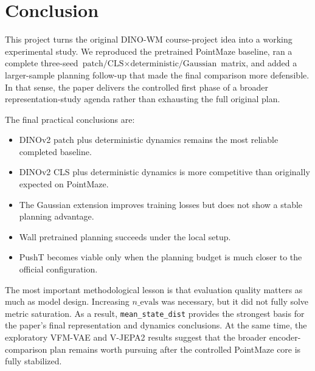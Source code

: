 \documentclass[11pt]{article}
\begin{document}
\section{Conclusion}
This project turns the original DINO-WM course-project idea into a working experimental study. We reproduced the pretrained PointMaze baseline, ran a complete three-seed \( \text{patch/CLS} \times \text{deterministic/Gaussian} \) matrix, and added a larger-sample planning follow-up that made the final comparison more defensible. In that sense, the paper delivers the controlled first phase of a broader representation-study agenda rather than exhausting the full original plan.

The final practical conclusions are:
\begin{itemize}
\item DINOv2 patch plus deterministic dynamics remains the most reliable completed baseline.
\item DINOv2 CLS plus deterministic dynamics is more competitive than originally expected on PointMaze.
\item The Gaussian extension improves training losses but does not show a stable planning advantage.
\item Wall pretrained planning succeeds under the local setup.
\item PushT becomes viable only when the planning budget is much closer to the official configuration.
\end{itemize}

The most important methodological lesson is that evaluation quality matters as much as model design. Increasing \(n\_\text{evals}\) was necessary, but it did not fully solve metric saturation. As a result, \texttt{mean\_state\_dist} provides the strongest basis for the paper's final representation and dynamics conclusions. At the same time, the exploratory VFM-VAE and V-JEPA2 results suggest that the broader encoder-comparison plan remains worth pursuing after the controlled PointMaze core is fully stabilized.



\end{document}
